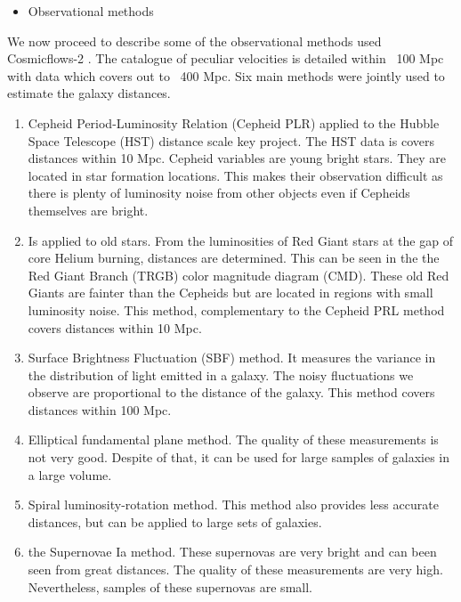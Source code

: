 \documentclass[12pt]{article}
\begin{document}
\begin{itemize}
\item Observational methods
\end{itemize}
\begin{par}
We now proceed to describe some of the observational
 methods used Cosmicflows-2
  \cite{tully_cosmicflows-2_2013}. The catalogue of
   peculiar velocities is detailed within ~100 Mpc with
    data which covers out to ~400 Mpc. Six main methods
     were jointly used to estimate the galaxy
      distances.	\\
 \begin{enumerate}
 \item Cepheid Period-Luminosity
      Relation (Cepheid PLR) applied to the Hubble
       Space Telescope (HST) distance scale key
        project. The HST data is covers distances
         within 10 Mpc. Cepheid variables are young
          bright stars. They are located in star
           formation locations. 
           This makes their observation
            difficult as there is plenty of luminosity
             noise from other objects even if Cepheids
              themselves are bright.\\
              
  \item Is applied to old stars. From the
 luminosities of Red Giant stars at the gap of core
  Helium burning, distances are determined. This can be
   seen in the the Red Giant Branch (TRGB) color
    magnitude diagram (CMD). These old Red Giants are
     fainter than the Cepheids but are located in
      regions with small luminosity noise. This method,
       complementary to the Cepheid PRL method covers
        distances within 10 Mpc.\\
        
  \item Surface Brightness Fluctuation (SBF) method. It
   measures the variance in the distribution of light
    emitted in a galaxy. The noisy fluctuations we
     observe are proportional to the distance of the
      galaxy. This method covers distances within 100
       Mpc.\\
  
  \item Elliptical fundamental plane
 method. The quality of these measurements is not very
  good. Despite of that, it can be used for large
   samples of galaxies in a large volume.\\
   
   \item Spiral luminosity-rotation
 method. This method also provides less accurate
  distances, but can be applied to large sets of
   galaxies.\\
   
  \item the Supernovae Ia method.
These supernovas are very bright and can been seen from
 great distances. The quality of these measurements are
  very high. Nevertheless, samples of these supernovas
   are small.
\end{enumerate}     

\end{par}
\end{document}
